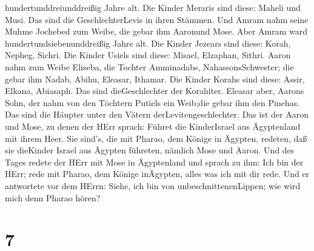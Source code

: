 hundertunddreiunddreißig Jahre alt.  Die Kinder Meraris
sind diese: Maheli und Musi. Das sind die GeschlechterLevis in ihren
Stämmen.  Und Amram nahm seine Muhme Jochebed zum Weibe,
die gebar ihm Aaronund Mose. Aber Amram ward hundertundsiebenunddreißig
Jahre alt.  Die Kinder Jezears sind diese: Korah, Nepheg,
Sichri.  Die Kinder Usiels sind diese: Misael, Elzaphan,
Sithri.  Aaron nahm zum Weibe Eliseba, die Tochter
Amminadabs, NahassonsSchwester; die gebar ihm Nadab, Abihu, Eleasar,
Ithamar.  Die Kinder Korahs sind diese: Assir, Elkana,
Abiasaph. Das sind dieGeschlechter der Korahiter.  Eleasar
aber, Aarons Sohn, der nahm von den Töchtern Putiels ein Weib;die gebar
ihm den Pinehas. Das sind die Häupter unter den Vätern
derLevitengeschlechter.  Das ist der Aaron und Mose, zu
denen der HErr sprach: Führet die KinderIsrael aus Ägyptenland mit ihrem
Heer.  Sie sind's, die mit Pharao, dem Könige in Ägypten,
redeten, daß sie dieKinder Israel aus Ägypten führeten, nämlich Mose und
Aaron.  Und des Tages redete der HErr mit Mose in
Ägyptenland  und sprach zu ihm: Ich bin der HErr; rede mit
Pharao, dem Könige inÄgypten, alles was ich mit dir rede. 
Und er antwortete vor dem HErrn: Siehe, ich bin von
unbeschnittenenLippen; wie wird mich denn Pharao hören?

\hypertarget{section-6}{%
\section{7}\label{section-6}}

